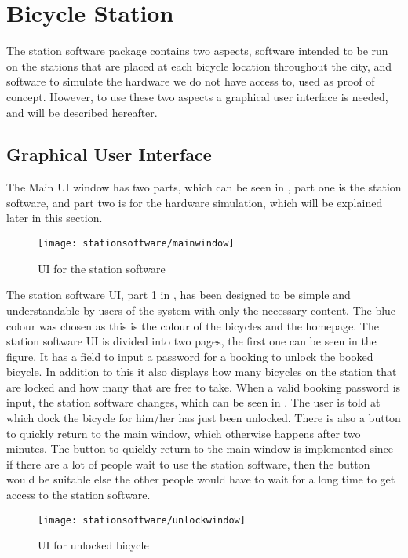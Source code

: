 \section{Bicycle Station}
The station software package contains two aspects, software intended to be run on the stations that are placed at each bicycle location throughout the city, and software to simulate the hardware we do not have access to, used as proof of concept. 
However, to use these two aspects a graphical user interface is needed, and will be described hereafter.

\subsection{Graphical User Interface}
The Main UI window has two parts, which can be seen in , part one is the station software, and part two is for the hardware simulation, which will be explained later in this section.

\begin{figure}[h]
	\centering
	\texttt{[image: stationsoftware/mainwindow]}
	\caption{UI for the station software}\label{fig:stationMain}
\end{figure}

The station software UI, part 1 in , has been designed to be simple and understandable by users of the system with only the necessary content.
The blue colour was chosen as this is the colour of the bicycles and the \bycykel homepage.
The station software UI is divided into two pages, the first one can be seen in the figure.
It has a field to input a password for a booking to unlock the booked bicycle.
In addition to this it also displays how many bicycles on the station that are locked and how many that are free to take.
When a valid booking password is input, the station software changes, which can be seen in .
The user is told at which dock the bicycle for him/her has just been unlocked.
There is also a button to quickly return to the main window, which otherwise happens after two minutes.
The button to quickly return to the main window is implemented since if there are a lot of people wait to use the station software, then the button would be suitable else the other people would have to wait for a long time to get access to the station software.

\begin{figure}[h]
	\centering
	\texttt{[image: stationsoftware/unlockwindow]}
	\caption{UI for unlocked bicycle}\label{fig:bicycleUnlock}
\end{figure}


